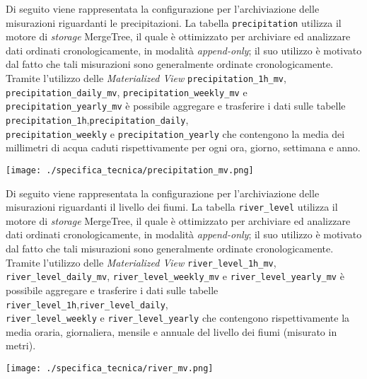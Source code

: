 Di seguito viene rappresentata la configurazione per l'archiviazione delle misurazioni riguardanti le precipitazioni.
La tabella \texttt{precipitation} utilizza il motore di \textit{storage} MergeTree, il quale è ottimizzato per archiviare ed analizzare dati ordinati cronologicamente,
in modalità \textit{append-only}; il suo utilizzo è motivato dal fatto che tali misurazioni sono generalmente ordinate cronologicamente.
Tramite l'utilizzo delle \textit{Materialized View} \texttt{precipitation\_1h\_mv},\\\texttt{precipitation\_daily\_mv}, \texttt{precipitation\_weekly\_mv} e \texttt{precipitation\_yearly\_mv}
è possibile aggregare e trasferire i dati sulle tabelle \texttt{precipitation\_1h},\texttt{precipitation\_daily},\\ \texttt{precipitation\_weekly} e \texttt{precipitation\_yearly}
che contengono la media dei millimetri di acqua caduti rispettivamente per ogni ora, giorno, settimana e anno.
\begin{center}
	\texttt{[image: ./specifica\_tecnica/precipitation\_mv.png]}
\end{center}

Di seguito viene rappresentata la configurazione per l'archiviazione delle misurazioni riguardanti il livello dei fiumi.
La tabella \texttt{river\_level} utilizza il motore di \textit{storage} MergeTree, il quale è ottimizzato per archiviare ed analizzare dati ordinati cronologicamente,
in modalità \textit{append-only}; il suo utilizzo è motivato dal fatto che tali misurazioni sono generalmente ordinate cronologicamente.
Tramite l'utilizzo delle \textit{Materialized View} \texttt{river\_level\_1h\_mv},\\\texttt{river\_level\_daily\_mv}, \texttt{river\_level\_weekly\_mv} e \texttt{river\_level\_yearly\_mv}
è possibile aggregare e trasferire i dati sulle tabelle \texttt{river\_level\_1h},\texttt{river\_level\_daily},\\ \texttt{river\_level\_weekly} e \texttt{river\_level\_yearly}
che contengono rispettivamente la media oraria, giornaliera, mensile e annuale del livello dei fiumi (misurato in metri).

\begin{center}
	\texttt{[image: ./specifica\_tecnica/river\_mv.png]}
\end{center}

